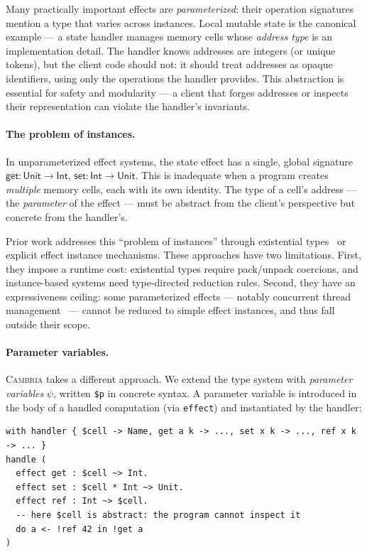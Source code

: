 \documentclass[acmsmall,screen,review,anonymous]{acmart}
\newcommand{\cambria}{\textsc{Cambria}}
\newcommand{\unit}{\mathsf{Unit}}
\newcommand{\tint}{\mathsf{Int}}
\begin{document}
Many practically important effects are \emph{parameterized}: their operation signatures mention a type that varies across instances. Local mutable state is the canonical example --- a state handler manages memory cells whose \emph{address type} is an implementation detail. The handler knows addresses are integers (or unique tokens), but the client code should not: it should treat addresses as opaque identifiers, using only the operations the handler provides. This abstraction is essential for safety and modularity --- a client that forges addresses or inspects their representation can violate the handler's invariants.

\paragraph{The problem of instances.}
In unparameterized effect systems, the state effect has a single, global signature $\mathsf{get} : \unit \to \tint$, $\mathsf{set} : \tint \to \unit$. This is inadequate when a program creates \emph{multiple} memory cells, each with its own identity. The type of a cell's address --- the \emph{parameter} of the effect --- must be abstract from the client's perspective but concrete from the handler's.

Prior work addresses this ``problem of instances'' through existential types~\cite{biernacki2018handle} or explicit effect instance mechanisms. These approaches have two limitations. First, they impose a runtime cost: existential types require pack/unpack coercions, and instance-based systems need type-directed reduction rules. Second, they have an expressiveness ceiling: some parameterized effects --- notably concurrent thread management~\cite{kammar2025equational} --- cannot be reduced to simple effect instances, and thus fall outside their scope.

\paragraph{Parameter variables.}
\cambria{} takes a different approach. We extend the type system with \emph{parameter variables} $\psi$, written \lstinline{$p} in concrete syntax. A parameter variable is introduced in the body of a handled computation (via \lstinline{effect}) and instantiated by the handler:

\begin{lstlisting}
with handler { $cell -> Name, get a k -> ..., set x k -> ..., ref x k -> ... }
handle (
  effect get : $cell ~> Int.
  effect set : $cell * Int ~> Unit.
  effect ref : Int ~> $cell.
  -- here $cell is abstract: the program cannot inspect it
  do a <- !ref 42 in !get a
)
\end{lstlisting}
\end{document}
